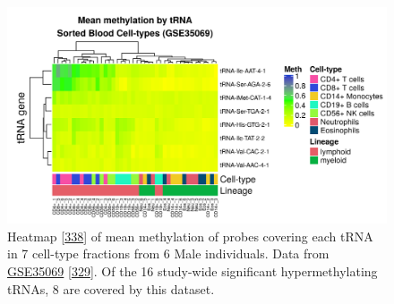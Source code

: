\documentclass[
]{book}
\begin{document}
\begin{figure}

{\centering \includegraphics[width=1\linewidth]{./figs/meanMethbytRNAMatLowBB6_bl} 

}

\caption{Heatmap {[}\protect\hyperlink{ref-Gu2016}{338}{]} of mean methylation of probes covering each tRNA in 7 cell-type fractions from 6 Male individuals. Data from \href{https://www.ncbi.nlm.nih.gov/geo/query/acc.cgi?acc=GSE35069}{GSE35069} {[}\protect\hyperlink{ref-Reinius2012}{329}{]}. Of the 16 study-wide significant hypermethylating tRNAs, 8 are covered by this dataset.}\label{fig:meanMethbytRNAMatLowBB6}
\end{figure}
\end{document}
